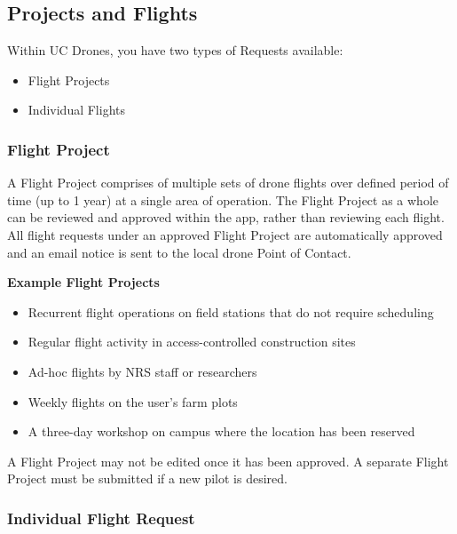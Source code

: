 \documentclass[
  12pt,
]{book}
\providecommand{\tightlist}{%
  \setlength{\itemsep}{0pt}\setlength{\parskip}{0pt}}
\begin{document}
\hypertarget{projects-and-flights}{%
\subsection{Projects and Flights}\label{projects-and-flights}}

Within UC Drones, you have two types of Requests available:

\begin{itemize}
\tightlist
\item
  Flight Projects
\item
  Individual Flights
\end{itemize}

\hypertarget{flight-project}{%
\subsubsection{Flight Project}\label{flight-project}}

A Flight Project comprises of multiple sets of drone flights over defined period of time (up to 1 year) at a single area of operation. The Flight Project as a whole can be reviewed and approved within the app, rather than reviewing each flight. All flight requests under an approved Flight Project are automatically approved and an email notice is sent to the local drone Point of Contact.

\textbf{Example Flight Projects}

\begin{itemize}
\tightlist
\item
  Recurrent flight operations on field stations that do not require scheduling
\item
  Regular flight activity in access-controlled construction sites
\item
  Ad-hoc flights by NRS staff or researchers
\item
  Weekly flights on the user's farm plots
\item
  A three-day workshop on campus where the location has been reserved
\end{itemize}

A Flight Project may not be edited once it has been approved. A separate Flight Project must be submitted if a new pilot is desired.

\hypertarget{individual-flight-request}{%
\subsubsection{Individual Flight Request}\label{individual-flight-request}}
\end{document}
